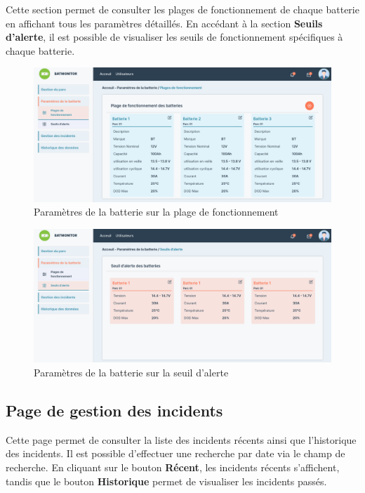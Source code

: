 Cette section permet de consulter les plages de fonctionnement de chaque batterie en affichant tous les paramètres détaillés. En accédant à la section \textbf{Seuils d'alerte}, il est possible de visualiser les seuils de fonctionnement spécifiques à chaque batterie.



\begin{figure}[H]
	\centering
	\includegraphics[width=17cm]{./img/interface/PlageFonctionement.png}
	\caption{Paramètres de la batterie sur la plage de fonctionnement}
	\label{fig:relais_5vdc}
\end{figure}

\begin{figure}[H]
	\centering
	\includegraphics[width=17cm]{./img/interface/seuilAlerte.png}
	\caption{Paramètres de la batterie sur la seuil d'alerte}
	\label{fig:relais_5vdc}
\end{figure}


\subsection{Page de gestion des incidents}

Cette page permet de consulter la liste des incidents récents ainsi que l'historique des incidents. Il est possible d'effectuer une recherche par date via le champ de recherche. En cliquant sur le bouton \textbf{Récent}, les incidents récents s'affichent, tandis que le bouton \textbf{Historique} permet de visualiser les incidents passés.

